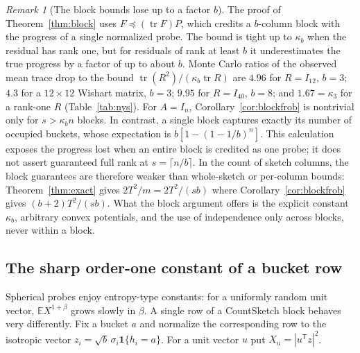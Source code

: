 \documentclass[11pt,a4paper]{article}
\theoremstyle{definition}
\theoremstyle{remark}
\newtheorem{remark}[theorem]{Remark}
\newcommand{\E}{\mathbb E}
\newcommand{\tr}{\operatorname{tr}}
\newcommand{\1}{\mathbf 1}
\newcommand{\T}{\mathsf T}
\begin{document}
\begin{remark}[The block bounds lose up to a factor $b$]\label{rem:blockloss}
The proof of Theorem~\ref{thm:block} uses $F\preceq(\tr F)P$, which
credits a $b$-column block with the progress of a single normalized
probe. The bound is tight up to $\kappa_b$ when the residual has rank
one, but for residuals of rank at least $b$ it underestimates the true
progress by a factor of up to about $b$. Monte Carlo ratios of the
observed mean trace drop to the bound $\tr(R^2)/(\kappa_b\tr R)$ are
$4.96$ for $R=I_{12}$, $b=3$; $4.3$ for a $12\times12$ Wishart matrix,
$b=3$; $9.95$ for $R=I_{40}$, $b=8$; and $1.67=\kappa_3$ for a rank-one
$R$ (Table~\ref{tab:nys}). For $A=I_n$, Corollary~\ref{cor:blockfrob} is
nontrivial only for $s>\kappa_bn$ blocks. In contrast, a single block
captures exactly its number of occupied buckets, whose expectation is
$b[1-(1-1/b)^n]$. This calculation exposes the progress lost when an
entire block is credited as one probe; it does not assert guaranteed
full rank at $s=\lceil n/b\rceil$. In the count of sketch columns, the block
guarantees are therefore weaker than whole-sketch or per-column bounds:
Theorem~\ref{thm:exact} gives $2T^2/m=2T^2/(sb)$ where
Corollary~\ref{cor:blockfrob} gives $(b+2)T^2/(sb)$. What the block
argument offers is the explicit constant $\kappa_b$, arbitrary convex
potentials, and the use of independence only across blocks, never within
a block.
\end{remark}

\subsection{The sharp order-one constant of a bucket row}
Spherical probes enjoy entropy-type constants: for a uniformly random
unit vector, $\E X^{1+\beta}$ grows slowly in $\beta$. A single row of a
CountSketch block behaves very differently. Fix a bucket $a$ and
normalize the corresponding row to the isotropic vector
$z_i=\sqrt b\,\sigma_i\1\{h_i=a\}$. For a unit vector $u$ put
$X_u=|u^\T z|^2$.
\end{document}
